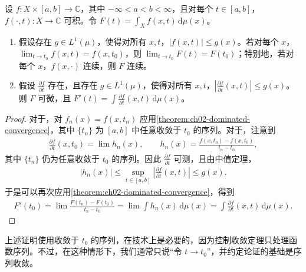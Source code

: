 \documentclass[../../main.tex]{subfiles}%
\begin{document}
\begin{theorem}\label{theorem:ch02-parameter-integrals}
设 $f:X\times[a,b]\to\mathbb{C}$，其中 $-\infty<a<b<\infty$，且对每个 $t\in[a,b]$，$f(\cdot,t):X\to\mathbb{C}$ 可积。令 $F(t)=\int_X f(x,t)\,\mathrm{d}\mu(x)$。
\begin{enumerate}
\item\label{item:ch02-parameter-continuity} 假设存在 $g\in L^1(\mu)$，使得对所有 $x,t$，$|f(x,t)|\le g(x)$。若对每个 $x$，$\lim_{t\to t_0}f(x,t)=f(x,t_0)$，则 $\lim_{t\to t_0}F(t)=F(t_0)$；特别地，若对每个 $x$，$f(x,\cdot)$ 连续，则 $F$ 连续。
\item\label{item:ch02-parameter-differentiation} 假设 $\frac{\partial f}{\partial t}$ 存在，且存在 $g\in L^1(\mu)$，使得对所有 $x,t$，$|\frac{\partial f}{\partial t}(x,t)|\le g(x)$。则 $F$ 可微，且 $F'(t)=\int\frac{\partial f}{\partial t}(x,t)\,\mathrm{d}\mu(x)$。
\end{enumerate}
\end{theorem}
\begin{proof}
对于，对 $f_n(x)=f(x,t_n)$ 应用\cref{theorem:ch02-dominated-convergence}，其中 $\{t_n\}$ 为 $[a,b]$ 中任意收敛于 $t_0$ 的序列。对于，注意到
\begin{align*}
\frac{\partial f}{\partial t}(x,t_0)=\lim h_n(x),\qquad
h_n(x)=\frac{f(x,t_n)-f(x,t_0)}{t_n-t_0},
\end{align*}
其中 $\{t_n\}$ 仍为任意收敛于 $t_0$ 的序列。因此 $\frac{\partial f}{\partial t}$ 可测，且由中值定理，
\begin{align*}
|h_n(x)|\le\sup_{t\in[a,b]}\left|\frac{\partial f}{\partial t}(x,t)\right|\le g(x).
\end{align*}
于是可以再次应用\cref{theorem:ch02-dominated-convergence}，得到
\begin{align*}
F'(t_0)=\lim\frac{F(t_n)-F(t_0)}{t_n-t_0}=\lim\int h_n(x)\,\mathrm{d}\mu(x)=\int\frac{\partial f}{\partial t}(x,t)\,\mathrm{d}\mu(x).
\end{align*}
\end{proof}
\begin{remark}
上述证明使用收敛于 $t_0$ 的序列，在技术上是必要的，因为控制收敛定理只处理函数序列。不过，在这种情形下，我们通常只说“令 $t\to t_0$”，并约定论证的基础是序列收敛。
\end{remark}
\end{document}
